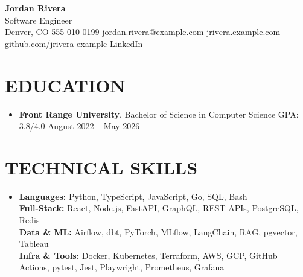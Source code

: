 \documentclass[letterpaper,10pt]{article}
\newlength{\entrygap}
\newcommand{\resumeEducation}[4]{
  \item \textbf{#1}, #2 {\small\if\relax\detokenize{#3}\relax\else\textbar{} #3 \fi\textbar{} #4}\par
}
\newcommand{\resumeSubHeadingListStart}{\begin{itemize}[leftmargin=0.15in,label={},itemsep=\entrygap,topsep=1pt,parsep=0pt,partopsep=0pt]}
\newcommand{\resumeSubHeadingListEnd}{\end{itemize}}
\begin{document}
\begin{center}
  {\LARGE\bfseries Jordan Rivera} \\[2pt]
  {\small Software Engineer} \\[2pt]
  \small
  Denver, CO \textbar{}
  555-010-0199 \textbar{}
  \href{mailto:jordan.rivera@example.com}{jordan.rivera@example.com} \textbar{}
  \href{https://jrivera.example.com}{jrivera.example.com} \textbar{}
  \href{https://github.com/jrivera-example}{github.com/jrivera-example} \textbar{}
  \href{https://linkedin.com/in/jordanrivera-example}{LinkedIn}
\end{center}
\section{EDUCATION}
\resumeSubHeadingListStart
  \resumeEducation
    {Front Range University}{Bachelor of Science in Computer Science}
    {GPA: 3.8/4.0}{August 2022 -- May 2026}
\resumeSubHeadingListEnd
\section{TECHNICAL SKILLS}
\begin{itemize}[leftmargin=0.15in,label={},topsep=3pt,parsep=0pt]
  \small\item
    \textbf{Languages:} Python, TypeScript, JavaScript, Go, SQL, Bash \\
    \textbf{Full-Stack:} React, Node.js, FastAPI, GraphQL, REST APIs, PostgreSQL, Redis \\
    \textbf{Data \& ML:} Airflow, dbt, PyTorch, MLflow, LangChain, RAG, pgvector, Tableau \\
    \textbf{Infra \& Tools:} Docker, Kubernetes, Terraform, AWS, GCP, GitHub Actions, pytest, Jest, Playwright, Prometheus, Grafana
\end{itemize}
\end{document}
